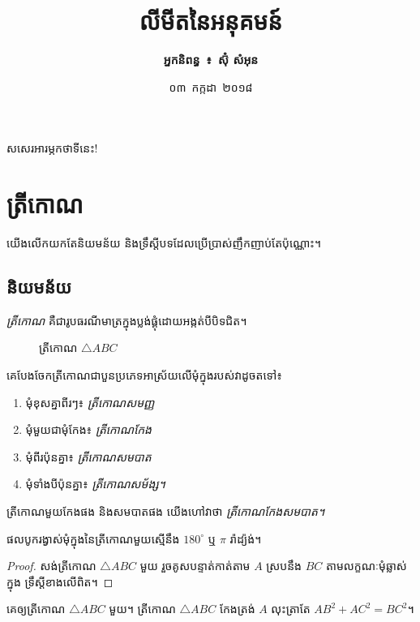 \documentclass[12pt]{book}
\title{\huge\bfseries លីមីតនៃអនុគមន៍}
\author{\bfseries អ្នកនិពន្ធ~៖~ស៊ុំ សំអុន}
\date{ ០៣~កក្កដា~២០១៨}
\begin{document}
	\frontmatter
	\maketitle
	\chapter{\prefacename}
	សសេរអារម្ភកថាទីនេះ!
	\tableofcontents
	\listoftables
	\listoffigures
	\mainmatter
	\chapter{ត្រីកោណ}
	យើងលើកយកតែនិយមន័យ និងទ្រឹស្ដីបទដែលប្រើប្រាស់ញឹកញាប់តែប៉ុណ្ណោះ។
	\section{និយមន័យ}
	\begin{definition}
		\emph{ត្រីកោណ} គឺជារូបធរណីមាត្រក្នុងប្លង់ផ្គុំដោយអង្កត់បីបិទជិត។
		\begin{figure}[H]
			\centering
			\caption{ត្រីកោណ $ \triangle ABC $}
		\end{figure}
	\end{definition}
	\begin{property}
		គេបែងចែកត្រីកោណជាបួនប្រភេទអាស្រ័យលើមុំក្នុងរបស់វាដូចតទៅ៖
		\begin{multicols}{2}
			\begin{enumerate}
				\item មុំខុសគ្នាពីរៗ៖ \emph{ត្រីកោណសមញ្ញ}
				\item មុំមួយជាមុំកែង៖ \emph{ត្រីកោណកែង}
				\item មុំពីរប៉ុនគ្នា៖ \emph{ត្រីកោណសមបាត}
				\item មុំទាំងបីប៉ុនគ្នា៖ \emph{ត្រីកោណសម័ង្ស។}
			\end{enumerate}
		\end{multicols}
	\end{property}
	ត្រីកោណមួយកែងផង និងសមបាតផង យើងហៅវាថា \emph{ត្រីកោណកែងសមបាត។}
	\begin{theorem}
		ផលបូករង្វាស់មុំក្នុងនៃត្រីកោណមួយស្មើនឹង $ 180^\circ $ ឬ $ \pi $ រ៉ាដ្យ៉ង់។
	\end{theorem}
	\begin{proof}
		សង់ត្រីកោណ $ \triangle ABC $ មួយ រួចគូសបន្ទាត់កាត់តាម $ A $ ស្របនឹង $ BC $ តាមលក្ខណៈមុំឆ្លាស់ក្នុង ទ្រឹស្ដីខាងលើពិត។
	\end{proof}
	\begin{theorem}[ពីតាគ័រ]
		គេឲ្យត្រីកោណ $ \triangle ABC $ មួយ។ ត្រីកោណ $ \triangle ABC $ កែងត្រង់ $ A $ លុះត្រាតែ $ AB^2+AC^2=BC^2 $។
	\end{theorem}
\end{document}
